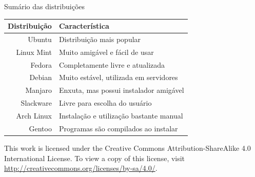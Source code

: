 \documentclass{beamer}
\begin{document}
\begin{frame}{Sumário das distribuições}
 \begin{center}
 \begin{tabular}{||r | l||} 
 \hline
 \textbf{Distribuição} & \textbf{Característica}\\ [0.5ex] 
 \hline\hline
 Ubuntu & Distribuição mais popular\\ 
 \hline
 Linux Mint & Muito amigável e fácil de usar\\
 \hline
 Fedora & Completamente livre e atualizada\\
 \hline
 Debian & Muito estável, utilizada em servidores\\
 \hline
 Manjaro & Enxuta, mas possui instalador amigável\\
 \hline
 Slackware & Livre para escolha do usuário\\
 \hline
 Arch Linux & Instalação e utilização bastante manual\\
 \hline
 Gentoo & Programas são compilados ao instalar\\
 \hline
\end{tabular}
\end{center}
\end{frame}

\begin{frame}
  This work is licensed under the Creative Commons Attribution-ShareAlike 4.0 International License. To view a copy of this license, visit \url{http://creativecommons.org/licenses/by-sa/4.0/}.
\end{frame}
\end{document}
